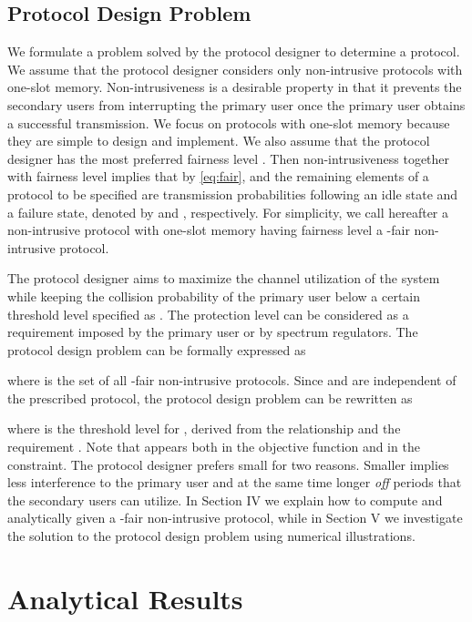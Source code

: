 \documentclass[12pt,draftclsnofoot,onecolumn]{IEEEtran}
\begin{document}
\subsection{Protocol Design Problem}

We formulate a problem solved by the protocol designer to determine
a protocol.
We assume that the protocol designer considers only non-intrusive protocols
with one-slot memory. Non-intrusiveness is a desirable property in that
it prevents the secondary users from interrupting the primary user once
the primary user obtains a successful transmission. We focus on protocols with one-slot
memory because they are simple to design and implement.
We also assume that the protocol designer has the most preferred fairness
level . Then non-intrusiveness together with fairness
level  implies that  by \eqref{eq:fair}, and the remaining elements of
a protocol to be specified are transmission probabilities
following an idle state and a failure state, denoted by  and
, respectively. For simplicity, we call hereafter
a non-intrusive protocol with one-slot memory having fairness level 
a -fair non-intrusive protocol.

The protocol designer aims to maximize the channel utilization
of the system while keeping the collision probability
of the primary user below a certain threshold level specified as .
The protection level  can be considered as a requirement imposed by the primary user
or by spectrum regulators.
The protocol design problem can be formally expressed as

where  is the set of all -fair non-intrusive protocols.
Since  and  are independent of the prescribed
protocol, the protocol design problem can be rewritten as

where  is the threshold level for
, derived from the relationship 
and the requirement .
Note that  appears both in the objective function and in the constraint.
The protocol designer prefers small  for two reasons. Smaller
 implies less interference to the primary user and at the same time
longer \emph{off} periods that the secondary users can utilize.
In Section IV we explain how to compute  and  analytically given
a -fair non-intrusive protocol,
while in Section V we investigate the solution to the protocol design problem using numerical illustrations.

\section{Analytical Results}
\end{document}
